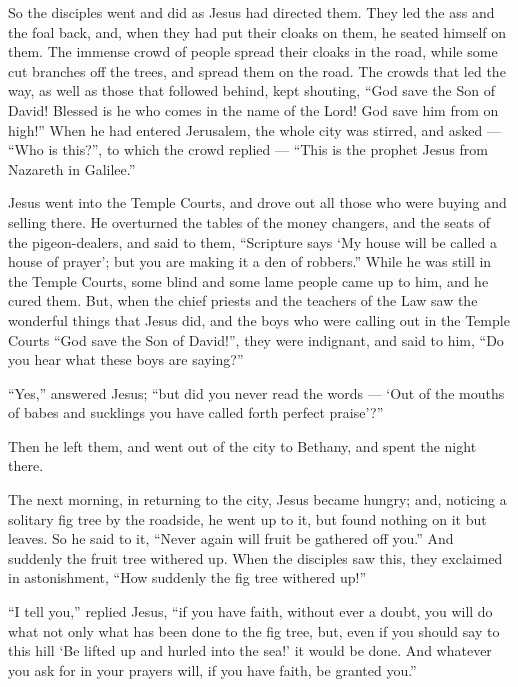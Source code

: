  So the disciples went and did as Jesus had directed them.
 They led the ass and the foal back, and, when they had put
their cloaks on them, he seated himself on them.  The
immense crowd of people spread their cloaks in the road, while some cut
branches off the trees, and spread them on the road.  The
crowds that led the way, as well as those that followed behind, kept
shouting, ``God save the Son of David! Blessed is he who comes in the
name of the Lord! God save him from on high!''  When he had
entered Jerusalem, the whole city was stirred, and asked ---
 ``Who is this?'', to which the crowd replied --- ``This is
the prophet Jesus from Nazareth in Galilee.''

 Jesus went into the Temple Courts, and drove out all those
who were buying and selling there. He overturned the tables of the money
changers, and the seats of the pigeon-dealers,  and said to
them, ``Scripture says `My house will be called a house of prayer'; but
you are making it a den of robbers.''  While he was still
in the Temple Courts, some blind and some lame people came up to him,
and he cured them.  But, when the chief priests and the
teachers of the Law saw the wonderful things that Jesus did, and the
boys who were calling out in the Temple Courts ``God save the Son of
David!'', they were indignant,  and said to him, ``Do you
hear what these boys are saying?''

``Yes,'' answered Jesus; ``but did you never read the words --- `Out of
the mouths of babes and sucklings you have called forth perfect
praise'?''

 Then he left them, and went out of the city to Bethany,
and spent the night there.

 The next morning, in returning to the city, Jesus became
hungry;  and, noticing a solitary fig tree by the roadside,
he went up to it, but found nothing on it but leaves. So he said to it,
``Never again will fruit be gathered off you.'' And suddenly the fruit
tree withered up.  When the disciples saw this, they
exclaimed in astonishment, ``How suddenly the fig tree withered up!''

 ``I tell you,'' replied Jesus, ``if you have faith,
without ever a doubt, you will do what not only what has been done to
the fig tree, but, even if you should say to this hill `Be lifted up and
hurled into the sea!' it would be done.  And whatever you
ask for in your prayers will, if you have faith, be granted you.''

